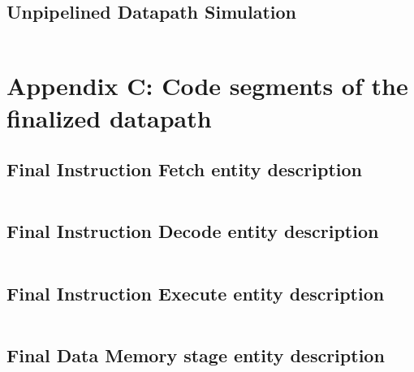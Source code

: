 \subsection{Unpipelined Datapath Simulation}
\begin{code}
\label{code:DPP_TB}  
\inputminted[fontsize=\footnotesize]{vhdl}{\simfolder WB_testbench.vhd}
\end{code}
\newpage

\section{Appendix C: Code segments of the finalized datapath}

\subsection{Final Instruction Fetch entity description}
\begin{code}
\label{code:IF_PPLND}  
\inputminted[fontsize=\footnotesize]{vhdl}{\srcfolder instr_fetch_pipeline.vhd}
\end{code}

\subsection{Final Instruction Decode entity description}
\begin{code}
\label{code:ID_PPLND}  
\inputminted[fontsize=\footnotesize]{vhdl}{\srcfolder instr_decode_pipeline.vhd}
\end{code}

\subsection{Final Instruction Execute entity description}
\begin{code}
\label{code:IE_PPLND}  
\inputminted[fontsize=\footnotesize]{vhdl}{\srcfolder instr_exec_pipeline.vhd}
\end{code}

\subsection{Final Data Memory stage entity description}
\begin{code}
\label{code:DM_PPLND}  
\inputminted[fontsize=\footnotesize]{vhdl}{\srcfolder data_memory_pipeline.vhd}
\end{code}

